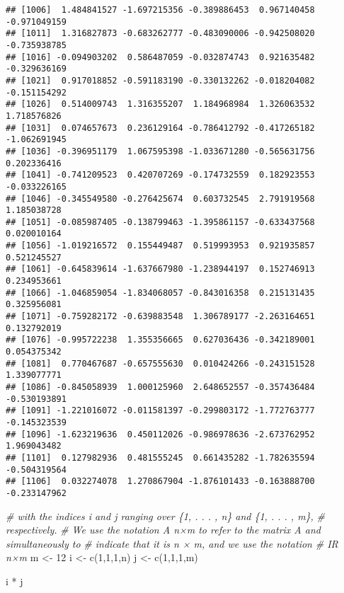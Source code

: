 \documentclass[
]{article}
\newenvironment{Shaded}{\begin{snugshade}}{\end{snugshade}}
\newcommand{\CommentTok}[1]{\textcolor[rgb]{0.56,0.35,0.01}{\textit{#1}}}
\newcommand{\DecValTok}[1]{\textcolor[rgb]{0.00,0.00,0.81}{#1}}
\newcommand{\FunctionTok}[1]{\textcolor[rgb]{0.00,0.00,0.00}{#1}}
\newcommand{\NormalTok}[1]{#1}
\newcommand{\OtherTok}[1]{\textcolor[rgb]{0.56,0.35,0.01}{#1}}
\newcommand{\SpecialCharTok}[1]{\textcolor[rgb]{0.00,0.00,0.00}{#1}}
\begin{document}
\begin{verbatim}
## [1006]  1.484841527 -1.697215356 -0.389886453  0.967140458 -0.971049159
## [1011]  1.316827873 -0.683262777 -0.483090006 -0.942508020 -0.735938785
## [1016] -0.094903202  0.586487059 -0.032874743  0.921635482 -0.329636169
## [1021]  0.917018852 -0.591183190 -0.330132262 -0.018204082 -0.151154292
## [1026]  0.514009743  1.316355207  1.184968984  1.326063532  1.718576826
## [1031]  0.074657673  0.236129164 -0.786412792 -0.417265182 -1.062691945
## [1036] -0.396951179  1.067595398 -1.033671280 -0.565631756  0.202336416
## [1041] -0.741209523  0.420707269 -0.174732559  0.182923553 -0.033226165
## [1046] -0.345549580 -0.276425674  0.603732545  2.791919568  1.185038728
## [1051] -0.085987405 -0.138799463 -1.395861157 -0.633437568  0.020010164
## [1056] -1.019216572  0.155449487  0.519993953  0.921935857  0.521245527
## [1061] -0.645839614 -1.637667980 -1.238944197  0.152746913  0.234953661
## [1066] -1.046859054 -1.834068057 -0.843016358  0.215131435  0.325956081
## [1071] -0.759282172 -0.639883548  1.306789177 -2.263164651  0.132792019
## [1076] -0.995722238  1.355356665  0.627036436 -0.342189001  0.054375342
## [1081]  0.770467687 -0.657555630  0.010424266 -0.243151528  1.339077771
## [1086] -0.845058939  1.000125960  2.648652557 -0.357436484 -0.530193891
## [1091] -1.221016072 -0.011581397 -0.299803172 -1.772763777 -0.145323539
## [1096] -1.623219636  0.450112026 -0.986978636 -2.673762952  1.969043482
## [1101]  0.127982936  0.481555245  0.661435282 -1.782635594 -0.504319564
## [1106]  0.032274078  1.270867904 -1.876101433 -0.163888700 -0.233147962
\end{verbatim}

\begin{Shaded}
\begin{Highlighting}[]
\CommentTok{\# with the indices i and j ranging over \{1, . . . , n\} and \{1, . . . , m\}, }
\CommentTok{\# respectively.}
\CommentTok{\# We use the notation A n×m to refer to the matrix A and simultaneously to}
\CommentTok{\# indicate that it is n × m, and we use the notation}
\CommentTok{\# IR n×m}
\NormalTok{m }\OtherTok{\textless{}{-}} \DecValTok{12}
\NormalTok{i }\OtherTok{\textless{}{-}} \FunctionTok{c}\NormalTok{(}\DecValTok{1}\NormalTok{,}\DecValTok{1}\NormalTok{,}\DecValTok{1}\NormalTok{,n)}
\NormalTok{j }\OtherTok{\textless{}{-}} \FunctionTok{c}\NormalTok{(}\DecValTok{1}\NormalTok{,}\DecValTok{1}\NormalTok{,}\DecValTok{1}\NormalTok{,m)}

\NormalTok{i }\SpecialCharTok{*}\NormalTok{ j}
\end{Highlighting}
\end{Shaded}
\end{document}

